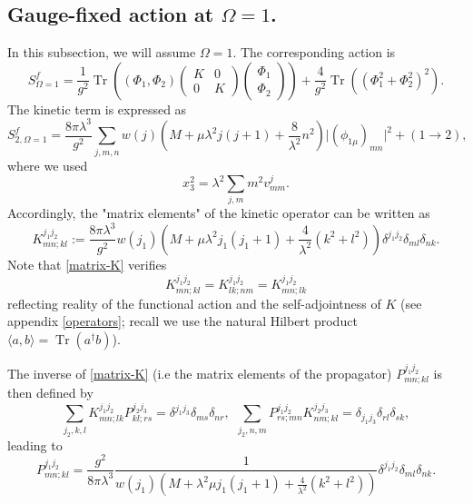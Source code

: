 \documentclass[a4paper,11pt,twoside]{article}
\numberwithin{equation}{section}
\DeclareMathOperator{\tr}{Tr}
\theoremstyle{nonumberplain}
\newcounter{and}
\begin{document}
\subsection{\texorpdfstring{Gauge-fixed action at $\Omega=1$.}{The Omega=1 case}}\label{subsection32}

In this subsection, we will assume $\Omega=1$. The corresponding action is%
%
\begin{equation}
S^f_{\Omega=1} = \frac{1}{g^2} \tr( (\Phi_1,\Phi_2)
\begin{pmatrix}
K&0\\
0&K
\end{pmatrix} 
\begin{pmatrix}
\Phi_1\\
\Phi_2
\end{pmatrix} 
)
+ \frac{4}{g^2} \tr( (\Phi_1^2 + \Phi_2^2)^2).\label{critical-action}
\end{equation}
%
The kinetic term is expressed as 
\begin{equation}
S^f_{2, \Omega=1}=\frac{8\pi\lambda^3}{g^2}\sum_{j,m,n}w(j)(M+\mu\lambda^2j(j+1)+\frac{8}{\lambda^2}n^2)\vert(\phi_{1\mu})_{mn}\vert^2+(1\to2)\label{kin-omega1},
\end{equation}
where we used
\begin{equation}
x_3^2 = \lambda^2 \sum_{j,m} m^2 v^j_{mm}.
\end{equation}
Accordingly, the "matrix elements" of the kinetic operator can be written as
\begin{equation}
K^{j_1 j_2}_{mn;kl} := \frac{8\pi\lambda^3}{g^2} w(j_1) ( M + \mu \lambda^2 j_1 (j_1+1) + \frac{4}{\lambda^2} (k^2+l^2) ) \delta^{j_1j_2} \delta_{ml} \delta_{nk}. \label{matrix-K} 
\end{equation}
Note that \eqref{matrix-K} verifies%
%
\begin{equation}
K^{j_1j_2}_{mn;kl} = K^{j_1j_2}_{lk;nm} = K^{j_1j_2}_{mn;lk} \label{sym-K}
\end{equation}
%
reflecting reality of the functional action and the self-adjointness of $K$ (see appendix \ref{operators}; recall we use the natural Hilbert product $\langle a,b \rangle = \tr(a^\dag b)$).\par

The inverse of \eqref{matrix-K} (i.e the matrix elements of the propagator) $P^{j_1j_2}_{mn;kl}$ is then defined by%
%
\begin{equation}
\sum_{j_2,k,l} K^{j_1j_2}_{mn;lk} P^{j_2j_3}_{kl;rs} = \delta^{j_1j_3} \delta_{ms} \delta_{nr}, \ \ \sum_{j_2,n,m} P^{j_1j_2}_{rs;mn} K^{j_2j_3}_{nm;kl} = \delta_{j_1j_3} \delta_{rl} \delta_{sk}, \label{propagator-def}
\end{equation}
%
leading to%
%
\begin{equation}
P^{j_1j_2}_{mn;kl} = \frac{g^2}{8\pi\lambda^3} \frac{1}{w(j_1)(M+\lambda^2\mu j_1(j_1+1)+\frac{4}{\lambda^2}(k^2+l^2))}\delta^{j_1j_2}\delta_{ml}\delta_{nk}.  \label{propagator}
\end{equation}
\end{document}

